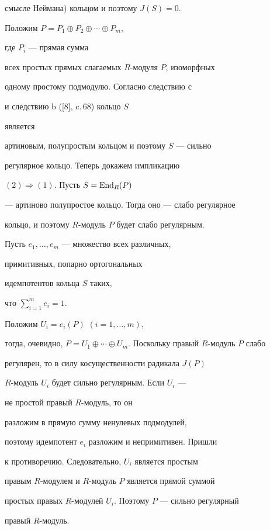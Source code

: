 смысле Неймана) кольцом и поэтому $J(S)=0$.





Положим $P= P_1\oplus P_2 \oplus \dotsb \oplus P_m$,


где $P_{i}$ --- прямая сумма


всех простых прямых слагаемых $R$-модуля $P$, изоморфных


одному простому подмодулю. Согласно следствию с


и следствию b ([8], c.\,68) кольцо $S$


является


артиновым, полупростым кольцом и поэтому $S$ --- сильно


регулярное кольцо. Теперь докажем импликацию





$(2) \Longrightarrow (1)$. Пусть $S=\operatorname{End}_{R}(P)$


--- артиново полупростое кольцо. Тогда оно --- слабо регулярное


кольцо, и поэтому $R$-модуль $P$ будет слабо регулярным.


Пусть $e_1,\dotsc,e_m$ --- множество всех различных,


примитивных, попарно ортогональных


идемпотентов кольца $S$ таких,


что $\sum\limits_{i=1}^{m}e_{i}=1$.


Положим $U_i=e_i(P)$ $(i=1,\dotsc,m)$,


тогда, очевидно, $P=U_1 \oplus


\dotsb \oplus U_m$. Поскольку правый $R$-модуль $P$ слабо


регулярен, то в силу косущественности радикала $J(P)$


$R$-модуль $U_i$ будет сильно регулярным. Если $U_i$ ---


не простой правый $R$-модуль, то он


разложим в прямую сумму ненулевых подмодулей,


поэтому идемпотент $e_i$ разложим и непримитивен. Пришли


к противоречию. Следовательно, $U_i$ является простым


правым $R$-модулем и $R$-модуль $P$ является прямой суммой


простых правых $R$-модулей $U_i$. Поэтому $P$ --- сильно регулярный


правый $R$-модуль.





